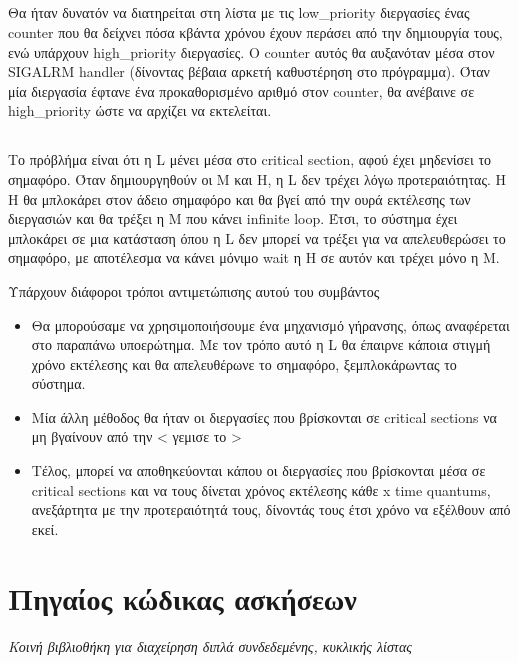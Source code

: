 \documentclass[a4paper,10pt]{article} \usepackage{anysize}
\begin{document}
\subsection{}
Θα ήταν δυνατόν να διατηρείται στη λίστα με τις low\_priority διεργασίες ένας
counter που θα δείχνει πόσα κβάντα χρόνου έχουν περάσει από την δημιουργία
τους, ενώ υπάρχουν high\_priority διεργασίες. Ο counter αυτός θα αυξανόταν μέσα
στον SIGALRM handler (δίνοντας βέβαια αρκετή καθυστέρηση στο πρόγραμμα). Όταν
μία διεργασία έφτανε ένα προκαθορισμένο αριθμό στον counter, θα ανέβαινε σε
high\_priority ώστε να αρχίζει να εκτελείται.
\subsection{}
Το πρόβλήμα είναι ότι η L μένει μέσα στο critical section, αφού έχει μηδενίσει
το σημαφόρο. Όταν δημιουργηθούν οι Μ και H, η L δεν τρέχει λόγω
προτεραιότητας. Η H θα μπλοκάρει στον άδειο σημαφόρο και θα βγεί από την ουρά
εκτέλεσης των διεργασιών και θα τρέξει η M που κάνει infinite loop. Έτσι, το
σύστημα έχει μπλοκάρει σε μια κατάσταση όπου η L δεν μπορεί να τρέξει για να
απελευθερώσει το σημαφόρο, με αποτέλεσμα να κάνει μόνιμο wait η H σε αυτόν και
τρέχει μόνο η M.

Υπάρχουν διάφοροι τρόποι αντιμετώπισης αυτού του συμβάντος
\begin{itemize}
\item Θα μπορούσαμε να χρησιμοποιήσουμε ένα μηχανισμό γήρανσης, όπως
αναφέρεται στο παραπάνω υποερώτημα. Με τον τρόπο αυτό η L θα έπαιρνε κάποια
στιγμή χρόνο εκτέλεσης και θα απελευθέρωνε το σημαφόρο, ξεμπλοκάρωντας το
σύστημα.
\item Μία άλλη μέθοδος θα ήταν οι διεργασίες που βρίσκονται σε critical
sections να μη βγαίνουν από την < γεμισε το >
\item Τέλος, μπορεί να αποθηκεύονται κάπου οι διεργασίες που βρίσκονται μέσα
σε critical sections και να τους δίνεται χρόνος εκτέλεσης κάθε x time
quantums, ανεξάρτητα με την προτεραιότητά τους, δίνοντάς τους έτσι χρόνο να
εξέλθουν από εκεί.

\end{itemize}

\vspace{1cm}
\def\thesubsection {Άσκηση \arabic{section}.\arabic{subsection}}
\section*{Πηγαίος κώδικας ασκήσεων}
\emph{Κοινή βιβλιοθήκη για διαχείρηση διπλά συνδεδεμένης, κυκλικής λίστας}
\inputminted[linenos,fontsize=\footnotesize,frame=leftline]{c}{files/queue.h}
\inputminted[linenos,fontsize=\footnotesize,frame=leftline]{c}{files/queue.c}
\setcounter{section}{1}
\setcounter{subsection}{0}
\end{document}
